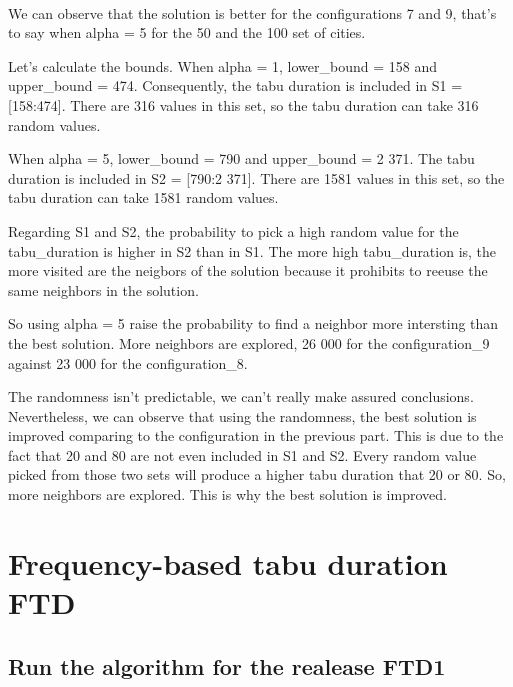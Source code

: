 \documentclass[12pt,oneside,a4paper]{article}
\begin{document}
\paragraph{}
We can observe that the solution is better for the configurations 7 and 9, that's to say when
alpha = 5 for the 50 and the 100 set of cities.

Let's calculate the bounds.
When alpha = 1, lower\_bound = 158 and upper\_bound = 474.
Consequently, the tabu duration is included in S1 = [158:474].
There are 316 values in this set, so the tabu duration can take 316 random values.

When alpha = 5, lower\_bound = 790 and upper\_bound = 2 371.
The tabu duration is included in S2 = [790:2 371].
There are 1581 values in this set, so the tabu duration can take 1581 random values.

Regarding S1 and S2, the probability to pick a high random value for the tabu\_duration is higher in S2 than in S1.
The more high tabu\_duration is, the more visited are the neigbors of the solution because it prohibits to reeuse the
same neighbors in the solution.

So using alpha = 5 raise the probability to find a neighbor more intersting than the best solution. More neighbors
are explored, 26 000 for the configuration\_9 against 23 000 for the configuration\_8.

The randomness isn’t predictable, we can’t really make assured conclusions.
Nevertheless, we can observe that using the randomness, the best solution is improved comparing to the configuration
in the previous part. This is due to the fact that 20 and 80 are not even included in S1 and S2.
Every random value picked from those two sets will produce a higher tabu duration that 20 or 80.
So, more neighbors are explored. This is why the best solution is improved.

\newpage
\section{Frequency-based tabu duration FTD}

\subsection{Run the algorithm for the realease FTD1}
\end{document}
